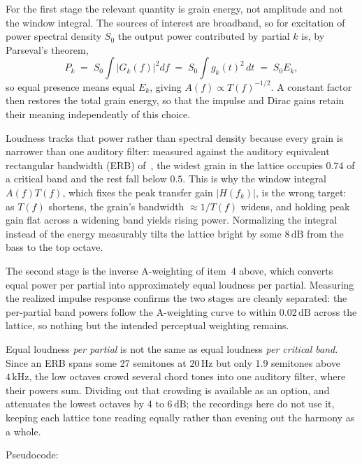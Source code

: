 \documentclass[runningheads,a4paper]{llncs}
\begin{document}
For the first stage the relevant quantity is grain energy, not amplitude and not
the window integral. The sources of interest are broadband, so for excitation of
power spectral density $S_0$ the output power contributed by partial $k$ is, by
Parseval's theorem,
\[
P_k \;=\; S_0\!\int \bigl|G_k(f)\bigr|^2 df
     \;=\; S_0\!\int g_k(t)^2\,dt
     \;=\; S_0 E_k ,
\]
so equal presence means equal $E_k$, giving $A(f)\propto T(f)^{-1/2}$. A
constant factor then restores the total grain energy, so that the impulse and
Dirac gains retain their meaning independently of this choice.

Loudness tracks that power rather than spectral density because every grain is
narrower than one auditory filter: measured against the auditory equivalent rectangular bandwidth (ERB) 
of~\cite{glasberg1990derivation}, the widest grain in the lattice occupies
$0.74$ of a critical band and the rest fall below $0.5$. This is why the window
integral $A(f)T(f)$, which fixes the peak transfer gain $|H(f_k)|$, is the wrong
target: as $T(f)$ shortens, the grain's bandwidth $\approx 1/T(f)$ widens, and
holding peak gain flat across a widening band yields rising power. Normalizing
the integral instead of the energy measurably tilts the lattice bright by some
$8\,\mathrm{dB}$ from the bass to the top octave.

The second stage is the inverse A-weighting of item~4 above, which converts
equal power per partial into approximately equal loudness per partial. Measuring
the realized impulse response confirms the two stages are cleanly separated: the
per-partial band powers follow the A-weighting curve to within
$0.02\,\mathrm{dB}$ across the lattice, so nothing but the intended perceptual
weighting remains.

Equal loudness \emph{per partial} is not the same as equal loudness \emph{per
critical band}. Since an ERB spans some 27 semitones at $20\,\mathrm{Hz}$ but
only 1.9 semitones above $4\,\mathrm{kHz}$, the low octaves crowd several chord
tones into one auditory filter, where their powers sum. Dividing out that
crowding is available as an option, and attenuates the lowest octaves by 4 to
$6\,\mathrm{dB}$; the recordings here do not use it, keeping each lattice tone
reading equally rather than evening out the harmony as a whole.

Pseudocode:
\end{document}
